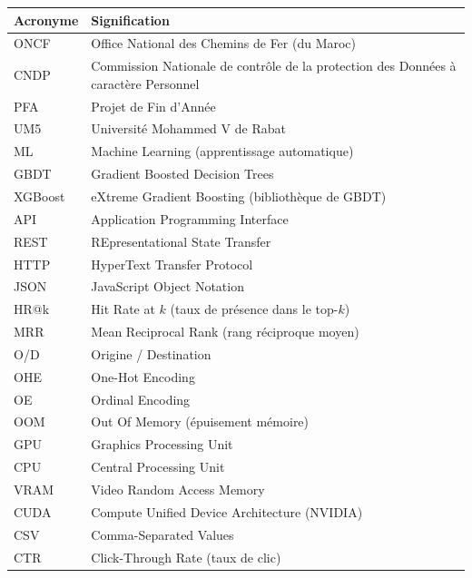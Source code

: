 \documentclass[11pt, a4paper]{article}
\begin{document}
\begin{tabularx}{\textwidth}{|l|X|}
\hline
\textbf{Acronyme} & \textbf{Signification} \\
\hline
ONCF        & Office National des Chemins de Fer (du Maroc) \\
\hline
CNDP        & Commission Nationale de contrôle de la protection des Données à caractère Personnel \\
\hline
PFA         & Projet de Fin d'Année \\
\hline
UM5         & Université Mohammed V de Rabat \\
\hline
ML          & Machine Learning (apprentissage automatique) \\
\hline
GBDT        & Gradient Boosted Decision Trees \\
\hline
XGBoost     & eXtreme Gradient Boosting (bibliothèque de GBDT) \\
\hline
API         & Application Programming Interface \\
\hline
REST        & REpresentational State Transfer \\
\hline
HTTP        & HyperText Transfer Protocol \\
\hline
JSON        & JavaScript Object Notation \\
\hline
HR@k        & Hit Rate at $k$ (taux de présence dans le top-$k$) \\
\hline
MRR         & Mean Reciprocal Rank (rang réciproque moyen) \\
\hline
O/D         & Origine / Destination \\
\hline
OHE         & One-Hot Encoding \\
\hline
OE          & Ordinal Encoding \\
\hline
OOM         & Out Of Memory (épuisement mémoire) \\
\hline
GPU         & Graphics Processing Unit \\
\hline
CPU         & Central Processing Unit \\
\hline
VRAM        & Video Random Access Memory \\
\hline
CUDA        & Compute Unified Device Architecture (NVIDIA) \\
\hline
CSV         & Comma-Separated Values \\
\hline
CTR         & Click-Through Rate (taux de clic) \\
\hline
\end{tabularx}

\newpage

\end{document}
